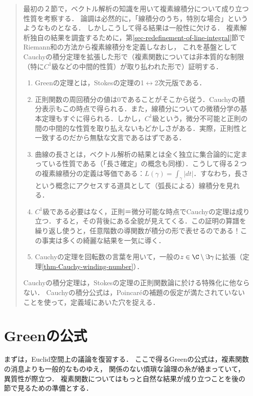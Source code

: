 \documentclass[uplatex, dvipdfmx]{jsreport}
\begin{document}
\begin{quotation}
    最初の２節で，ベクトル解析の知識を用いて複素線積分について成り立つ性質を考察する．
    論調は必然的に，「線積分のうち，特別な場合」というようなものとなる．
    しかしこうして得る結果は一般性に欠ける．
    複素解析独自の結果を調査するために，第\ref{sec-redefinement-of-line-integral}節で
    Riemann和の方法から複素線積分を定義しなおし，
    これを基盤としてCauchyの積分定理を拡張した形で（複素関数については非本質的な制限（特に$C^1$級などの中間的性質）が取り払われた形で）証明する．
    \begin{enumerate}
        \item Greenの定理とは，Stokesの定理の1$\leftrightarrow$2次元版である．
        \item 正則関数の周回積分の値は0であることがそこから従う．Cauchyの積分表示もこの時点で得られる．また，線積分についての微積分学の基本定理もすぐに得られる．しかし，$C^1$級という，微分不可能と正則の間の中間的な性質を取り払えないもどかしさがある．実際，正則性と一致するのだから無駄な文言であるはずである．
        \item 曲線の長さとは，ベクトル解析の結果とは全く独立に集合論的に定まっている性質である（「長さ確定」の概念も同様）．こうして得る２つの複素線積分の定義は等価である：$L(\gamma)=\int_\gamma|dt|$．すなわち，長さという概念にアクセスする道具として（弧長による）線積分を見れる．
        \item $C^1$級である必要はなく，正則＝微分可能な時点でCauchyの定理は成り立つ．すると，その背後にある全貌が見えてくる．この証明の算譜を繰り返し使うと，任意階数の導関数が積分の形で表せるのである！この事実は多くの綺麗な結果を一気に導く．
        \item Cauchyの定理を回転数の言葉を用いて，一般の$z\in\C\setminus\Im\gamma$に拡張（定理\ref{thm-Cauchy-winding-number}）．
    \end{enumerate}
    Cauchyの積分定理は，Stokesの定理の正則関数論に於ける特殊化に他ならない．
    Cauchyの積分公式は，Poincaréの補題の仮定が満たされていないことを使って，定義域にあいた穴を捉える．
\end{quotation}

\section{Greenの公式}

\begin{screen}
    まずは，Euclid空間上の議論を復習する．
    ここで得るGreenの公式は，複素関数の消息よりも一般的なものゆえ，
    関係のない煩瑣な論理の糸が絡まっていて，異質性が際立つ．
    複素関数についてはもっと自然な結果が成り立つことを後の節で見るための準備とする．
\end{screen}
\end{document}
